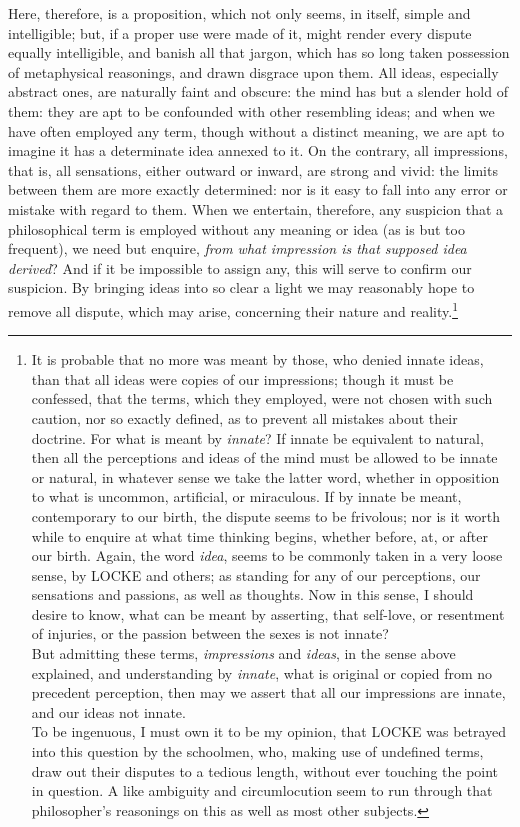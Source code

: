 \documentclass[]{article}
\newcounter{authornote}[page]
\newcommand*{\authornote}[1]{\renewcommand{\thefootnote}{\fnsymbol{footnote}}\stepcounter{authornote}\footnote[\value{authornote}]{#1}\renewcommand{\thefootnote}{\arabic{footnote}}}
\begin{document}
\begin{sectionbody}
\humeparagraph  Here, therefore, is a proposition, which not only seems, in itself, simple and intelligible; but, if a proper use were made of it, might render every dispute equally intelligible, and banish all that jargon, which has so long taken possession of metaphysical reasonings, and drawn disgrace upon them. All ideas, especially abstract ones, are naturally faint and obscure: the mind has but a slender hold of them: they are apt to be confounded with other resembling ideas; and when we have often employed any term, though without a distinct meaning, we are apt to imagine it has a determinate idea annexed to it. On the contrary, all impressions, that is, all sensations, either outward or inward, are strong and vivid: the limits between them are more exactly determined: nor is it easy to fall into any error or mistake with regard to them. When we entertain, therefore, any suspicion that a philosophical term is employed without any meaning or idea (as is but too frequent), we need but enquire, \emph{from what impression is that supposed idea derived}? And if it be impossible to assign any, this will serve to confirm our suspicion. By bringing ideas into so clear a light we may reasonably hope to remove all dispute, which may arise, concerning their nature and reality.\authornote{It is probable that no more was meant by those, who denied innate ideas, than that all ideas were copies of our impressions; though it must be confessed, that the terms, which they employed, were not chosen with such caution, nor so exactly defined, as to prevent all mistakes about their doctrine. For what is meant by \emph{innate}? If innate be equivalent to natural, then all the perceptions and ideas of the mind must be allowed to be innate or natural, in whatever sense we take the latter word, whether in opposition to what is uncommon, artificial, or miraculous. If by innate be meant, contemporary to our birth, the dispute seems to be frivolous; nor is it worth while to enquire at what time thinking begins, whether before, at, or after our birth. Again, the word \emph{idea}, seems to be commonly taken in a very loose sense, by LOCKE and others; as standing for any of our perceptions, our sensations and passions, as well as thoughts. Now in this sense, I should desire to know, what can be meant by asserting, that self-love, or resentment of injuries, or the passion between the sexes is not innate?
\\
But admitting these terms, \emph{impressions} and \emph{ideas}, in the sense above explained, and understanding by \emph{innate}, what is original or copied from no precedent perception, then may we assert that all our impressions are innate, and our ideas not innate.
\\
To be ingenuous, I must own it to be my opinion, that LOCKE was betrayed into this question by the schoolmen, who, making use of undefined terms, draw out their disputes to a tedious length, without ever touching the point in question. A like ambiguity and circumlocution seem to run through that philosopher's reasonings on this as well as most other subjects.}

\end{sectionbody}
\end{document}
